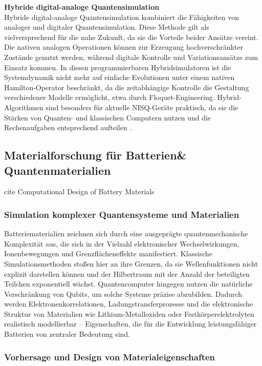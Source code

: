 \textbf{Hybride digital-analoge Quantensimulation} \\
Hybride digital-analoge Quantensimulation kombiniert die Fähigkeiten von analoger und digitaler Quantensimulation. Diese Methode gilt als vielversprechend für die nahe Zukunft, da sie die Vorteile beider Ansätze vereint. Die nativen analogen Operationen können zur Erzeugung hochverschränkter Zustände genutzt werden, während digitale Kontrolle und Variationsansätze zum Einsatz kommen. In diesen programmierbaren Hybridsimulatoren ist die Systemdynamik nicht mehr auf einfache Evolutionen unter einem nativen Hamilton-Operator beschränkt, da die zeitabhängige Kontrolle die Gestaltung verschiedener Modelle ermöglicht, etwa durch Floquet-Engineering. Hybrid-Algorithmen sind besonders für aktuelle NISQ-Geräte praktisch, da sie die Stärken von Quanten- und klassischen Computern nutzen und die Rechenaufgaben entsprechend aufteilen \cite{cao_quantum_2019}.

\subsection{Materialforschung für Batterien\& Quantenmaterialien}
cite Computational Design of Battery Materials

\subsubsection*{Simulation komplexer Quantensysteme und Materialien}

Batteriematerialien zeichnen sich durch eine ausgeprägte quantenmechanische Komplexität aus, die sich in der Vielzahl elektronischer Wechselwirkungen, Ionenbewegungen und Grenzflächeneffekte manifestiert. Klassische Simulationsmethoden stoßen hier an ihre Grenzen, da sie Wellenfunktionen nicht explizit darstellen können und der Hilbertraum mit der Anzahl der beteiligten Teilchen exponentiell wächst. Quantencomputer hingegen nutzen die natürliche Verschränkung von Qubits, um solche Systeme präzise abzubilden. Dadurch werden Elektronenkorrelationen, Ladungstransferprozesse und die elektronische Struktur von Materialien wie Lithium-Metalloxiden oder Festkörperelektrolyten realistisch modellierbar -- Eigenschaften, die für die Entwicklung leistungsfähiger Batterien von zentraler Bedeutung sind.

\subsubsection*{Vorhersage und Design von Materialeigenschaften}

